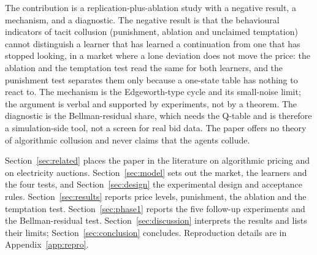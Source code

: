 The contribution is a replication-plus-ablation study with a negative result, a mechanism, and a diagnostic. The negative result is that the behavioural indicators of tacit collusion (punishment, ablation and unclaimed temptation) cannot distinguish a learner that has learned a continuation from one that has stopped looking, in a market where a lone deviation does not move the price: the ablation and the temptation test read the same for both learners, and the punishment test separates them only because a one-state table has nothing to react to. The mechanism is the Edgeworth-type cycle and its small-noise limit; the argument is verbal and supported by experiments, not by a theorem. The diagnostic is the Bellman-residual share, which needs the Q-table and is therefore a simulation-side tool, not a screen for real bid data. The paper offers no theory of algorithmic collusion and never claims that the agents collude.

Section~\ref{sec:related} places the paper in the literature on algorithmic pricing and on electricity auctions. Section~\ref{sec:model} sets out the market, the learners and the four tests, and Section~\ref{sec:design} the experimental design and acceptance rules. Section~\ref{sec:results} reports price levels, punishment, the ablation and the temptation test. Section~\ref{sec:phase1} reports the five follow-up experiments and the Bellman-residual test. Section~\ref{sec:discussion} interprets the results and lists their limits; Section~\ref{sec:conclusion} concludes. Reproduction details are in Appendix~\ref{app:repro}.
